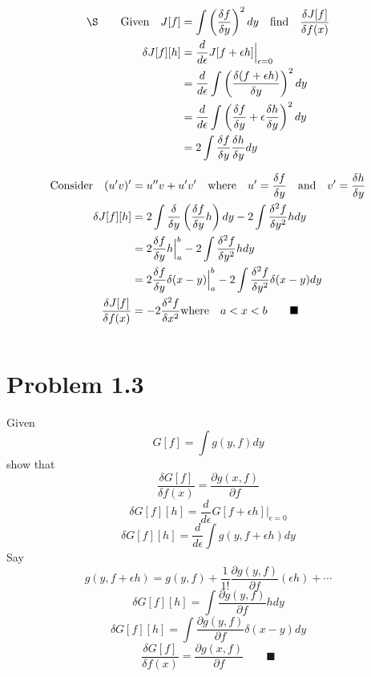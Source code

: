\documentclass{memoir}
\begin{document}
\begin{align*}
    \qq*{\S}\qq{Given}J[f] & =\int \left(\frac{\delta f}{\delta y}\right)^2 dy\qq{find}\frac{\delta J[f]}{\delta f(x)}               \\
    \delta J[f][h]         & =\frac{d}{d\epsilon}J[f+\epsilon h]\Big\vert_{\epsilon=0}                                               \\
                           & =\frac{d}{d\epsilon}\int \left(\frac{\delta (f+\epsilon h)}{\delta y}\right)^2 dy                       \\
                           & =\frac{d}{d\epsilon}\int \left(\frac{\delta f}{\delta y}+\epsilon\frac{\delta h}{\delta y} \right)^2 dy \\
                           & =2\int \frac{\delta f}{\delta y}\frac{\delta h}{\delta y}  dy                                           \\
\end{align*}

\begin{align*}
    \qq*{Consider}(u'v)'            & =u''v+u'v' \qq{where} u'=\frac{\delta f}{\delta y}\qand v'=\frac{\delta h}{\delta y}                          \\
    \delta J[f][h]                  & =2\int\frac{\delta}{\delta y}\left(\frac{\delta f}{\delta y}h\right)dy-2\int\frac{\delta^2 f}{\delta y^2}h dy \\
                                    & =2\frac{\delta f}{\delta y}h\Big\vert_a^b-2\int\frac{\delta^2 f}{\delta y^2}h dy                              \\
                                    & =2\frac{\delta f}{\delta y}\delta(x-y)\Big\vert_a^b-2\int\frac{\delta^2 f}{\delta y^2}\delta(x-y) dy          \\
    \frac{\delta J[f]}{\delta f(x)} & =-2\frac{\delta^2 f}{\delta x^2}\qq*{where}  a<x<b \qquad \blacksquare                                        \\
\end{align*}

\[\]

\section*{Problem 1.3}
Given \[G[f]=\int g(y,f)dy\]
show that \[\frac{\delta G[f]}{\delta f(x)}=\frac{\partial g(x,f)}{\partial f} \]
\[\delta G[f][h]=\frac{d}{d\epsilon}G[f+\epsilon h]\Big\vert_{\epsilon=0}\]
\[\delta G[f][h]=\frac{d}{d\epsilon}\int g(y,f+\epsilon h)dy\]
Say \[g(y,f+\epsilon h)=g(y,f)+\frac{1}{1!}\frac{\partial g(y,f)}{\partial f}(\epsilon h) + \cdots \]
\[\delta G[f][h]=\int\frac{\partial g(y,f)}{\partial f}hdy\]
\[\delta G[f][h]=\int\frac{\partial g(y,f)}{\partial f}\delta(x-y)dy\]
\[\frac{\delta G[f]}{\delta f(x)}=\frac{\partial g(x,f)}{\partial f} \qquad \blacksquare\]
\end{document}
